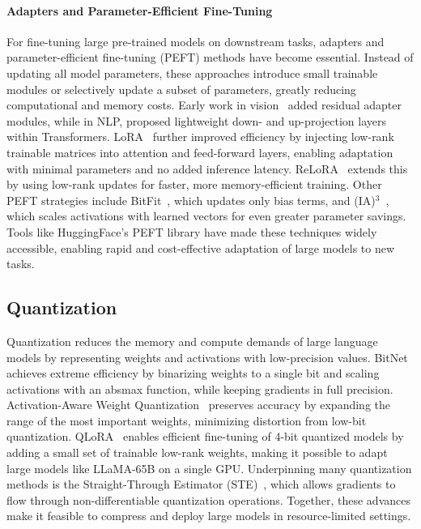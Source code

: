 \paragraph{Adapters and Parameter-Efficient Fine-Tuning}

For fine-tuning large pre-trained models on downstream tasks, adapters and parameter-efficient fine-tuning (PEFT) methods have become essential. Instead of updating all model parameters, these approaches introduce small trainable modules or selectively update a subset of parameters, greatly reducing computational and memory costs. Early work in vision~\citep{rebuffi2017adapters} added residual adapter modules, while in NLP, \citet{houlsby2019parameter} proposed lightweight down- and up-projection layers within Transformers. LoRA~\citep{hu2021lora} further improved efficiency by injecting low-rank trainable matrices into attention and feed-forward layers, enabling adaptation with minimal parameters and no added inference latency. ReLoRA~\citep{lialin2023relora} extends this by using low-rank updates for faster, more memory-efficient training. Other PEFT strategies include BitFit~\citep{benzaken2022bitfit}, which updates only bias terms, and (IA)$^3$~\citep{liu2022few}, which scales activations with learned vectors for even greater parameter savings. Tools like HuggingFace's PEFT library have made these techniques widely accessible, enabling rapid and cost-effective adaptation of large models to new tasks.

\subsection{Quantization}
Quantization reduces the memory and compute demands of large language models by representing weights and activations with low-precision values. BitNet~\citep{wang2023bitnet} achieves extreme efficiency by binarizing weights to a single bit and scaling activations with an absmax function, while keeping gradients in full precision. Activation-Aware Weight Quantization~\citep{lin2023awq} preserves accuracy by expanding the range of the most important weights, minimizing distortion from low-bit quantization. QLoRA~\citep{dettmers2023qlora} enables efficient fine-tuning of 4-bit quantized models by adding a small set of trainable low-rank weights, making it possible to adapt large models like LLaMA-65B on a single GPU. Underpinning many quantization methods is the Straight-Through Estimator (STE)~\citep{bengio2013estimating}, which allows gradients to flow through non-differentiable quantization operations. Together, these advances make it feasible to compress and deploy large models in resource-limited settings.


